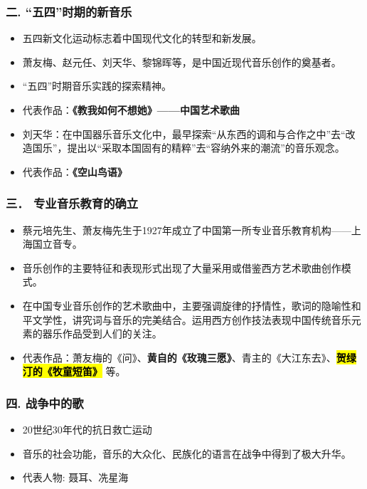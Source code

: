 \documentclass[
]{article}
\providecommand{\tightlist}{%
  \setlength{\itemsep}{0pt}\setlength{\parskip}{0pt}}
\begin{document}
\subsubsection{二.
``五四''时期的新音乐}\label{ux4e8c.-ux4e94ux56dbux65f6ux671fux7684ux65b0ux97f3ux4e50}

\begin{itemize}
\tightlist
\item
  五四新文化运动标志着中国现代文化的转型和新发展。
\item
  萧友梅、赵元任、刘天华、黎锦晖等，是中国近现代音乐创作的奠基者。
\item
  ``五四''时期音乐实践的探索精神。
\item
  代表作品：\textbf{《教我如何不想她》------中国艺术歌曲}
\item
  刘天华：在中国器乐音乐文化中，最早探索``从东西的调和与合作之中''去``改造国乐''，提出以``采取本国固有的精粹''去``容纳外来的潮流''的音乐观念。
\item
  代表作品：\textbf{《空山鸟语》}
\end{itemize}

\subsubsection{三．
专业音乐教育的确立}\label{ux4e09-ux4e13ux4e1aux97f3ux4e50ux6559ux80b2ux7684ux786eux7acb}

\begin{itemize}
\tightlist
\item
  蔡元培先生、萧友梅先生于1927年成立了中国第一所专业音乐教育机构------上海国立音专。
\item
  音乐创作的主要特征和表现形式出现了大量采用或借鉴西方艺术歌曲创作模式。
\item
  在中国专业音乐创作的艺术歌曲中，主要强调旋律的抒情性，歌词的隐喻性和平文学性，讲究词与音乐的完美结合。运用西方创作技法表现中国传统音乐元素的器乐作品受到人们的关注。
\item
  代表作品：萧友梅的《问》、\textbf{黄自的《玫瑰三愿》}、青主的《大江东去》、\hl{\mbox{\textbf{贺绿汀的《牧童短笛》}}}
  等。
\end{itemize}

\subsubsection{四.
战争中的歌}\label{ux56db.-ux6218ux4e89ux4e2dux7684ux6b4c}

\begin{itemize}
\tightlist
\item
  20世纪30年代的抗日救亡运动
\item
  音乐的社会功能，音乐的大众化、民族化的语言在战争中得到了极大升华。
\item
  代表人物: 聂耳、冼星海
\end{itemize}
\end{document}
